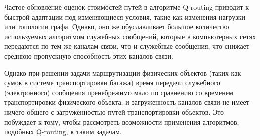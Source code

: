 \documentclass[specification,annotation,times]{itmo-student-thesis}
\theoremstyle{definition}
\begin{document}
Частое обновление оценок стоимостей путей в алгоритме Q-routing приводит к
быстрой адаптации под изменяющиеся условия, такие как изменения нагрузки или
топологии графа. Однако, оно же обуславливает большое количество используемых
алгоритмом служебных сообщений, которые в компьютерных сетях передаются по тем
же каналам связи, что и служебные сообщения, что снижает среднюю пропускную
способность этих каналов связи.

Однако при решении задачи маршрутизации физических объектов (таких как сумок в
системе транспортировки багажа) время передачи служебного (электронного)
сообщения пренебрежимо мало по сравнению со временем транспортировки физического
объекта, и загруженность каналов связи не имеет ничего общего с загруженностью
путей транспортировки объектов. Это побуждает к тому, чтобы рассмотреть
возможности применения алгоритмов, подобных Q-routing, к таким задачам.








\end{document}
